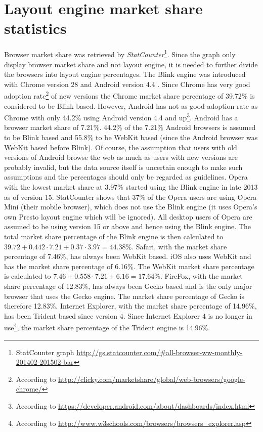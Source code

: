\documentclass[a4paper,11pt]{kth-mag}
\begin{document}
        \section{Layout engine market share statistics}\label{sec:layout_engines_market_share}
          Browser market share was retrieved by \emph{StatCounter}\footnote{StatCounter graph \url{http://gs.statcounter.com/#all-browser-ww-monthly-201402-201502-bar}}.
          Since the graph only display browser market share and not layout engine, it is needed to further divide the browsers into layout engine percentages.
          The Blink engine was introduced with Chrome version 28 and Android version 4.4 \cite{wiki_blink}.
          Since Chrome has very good adoption rate\footnote{According to \url{http://clicky.com/marketshare/global/web-browsers/google-chrome/}} of new versions the Chrome market share percentage of 39.72\% is considered to be Blink based.
          However, Android has not as good adoption rate as Chrome with only 44.2\% using Android version 4.4 and up\footnote{According to \url{https://developer.android.com/about/dashboards/index.html}}.
          Android has a browser market share of 7.21\%. 44.2\% of the 7.21\% Android browsers is assumed to be Blink based and 55.8\% to be WebKit based (since the Android browser was WebKit based before Blink).
          Of course, the assumption that users with old versions of Android browse the web as much as users with new versions are probably invalid, but the data source itself is uncertain enough to make such assumptions and the percentages should only be regarded as guidelines.
          Opera with the lowest market share at 3.97\% started using the Blink engine in late 2013 as of version 15.
          StatCounter shows that 37\% of the Opera users are using Opera Mini (their mobile browser), which does not use the Blink engine (it uses Opera's own Presto layout engine which will be ignored).
          All desktop users of Opera are assumed to be using version 15 or above and hence using the Blink engine.
          The total market share percentage of the Blink engine is then calculated to $39.72 + 0.442\cdot7.21 + 0.37\cdot3.97 = 44.38\%$.
          Safari, with the market share percentage of 7.46\%, has always been WebKit based.
          iOS also uses WebKit and has the market share percentage of 6.16\%.
          The WebKit market share percentage is calculated to $7.46 + 0.558\cdot7.21 + 6.16 = 17.64\%$.
          FireFox, with the market share percentage of 12.83\%, has always been Gecko based and is the only major browser that uses the Gecko engine.
          The market share percentage of Gecko is therefore 12.83\%.
          Internet Explorer, with the market share percentage of 14.96\%, has been Trident based since version 4.
          Since Internet Explorer 4 is no longer in use\footnote{According to \url{http://www.w3schools.com/browsers/browsers_explorer.asp}}, the market share percentage of the Trident engine is 14.96\%.
\end{document}
